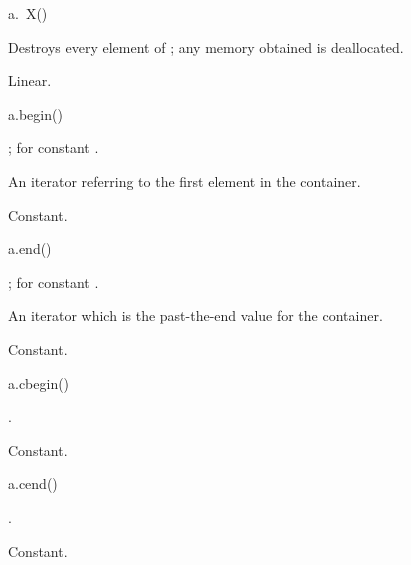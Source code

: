 \begin{itemdecl}
a.~X()
\end{itemdecl}

\begin{itemdescr}
\pnum
\result
{}

\pnum
\effects
Destroys every element of ; any memory obtained is deallocated.

\pnum
\complexity
Linear.
\end{itemdescr}

%
\begin{itemdecl}
a.begin()
\end{itemdecl}

\begin{itemdescr}
\pnum
\result
{};
 for constant .

\pnum
\returns
An iterator referring to the first element in the container.

\pnum
\complexity
Constant.
\end{itemdescr}

%
\begin{itemdecl}
a.end()
\end{itemdecl}

\begin{itemdescr}
\pnum
\result
{};
 for constant .

\pnum
\returns
An iterator which is the past-the-end value for the container.

\pnum
\complexity
Constant.
\end{itemdescr}

%
\begin{itemdecl}
a.cbegin()
\end{itemdecl}

\begin{itemdescr}
\pnum
\result
{}.

\pnum
\returns
{}

\pnum
\complexity
Constant.
\end{itemdescr}

%
\begin{itemdecl}
a.cend()
\end{itemdecl}

\begin{itemdescr}
\pnum
\result
{}.

\pnum
\returns
{}

\pnum
\complexity
Constant.
\end{itemdescr}

